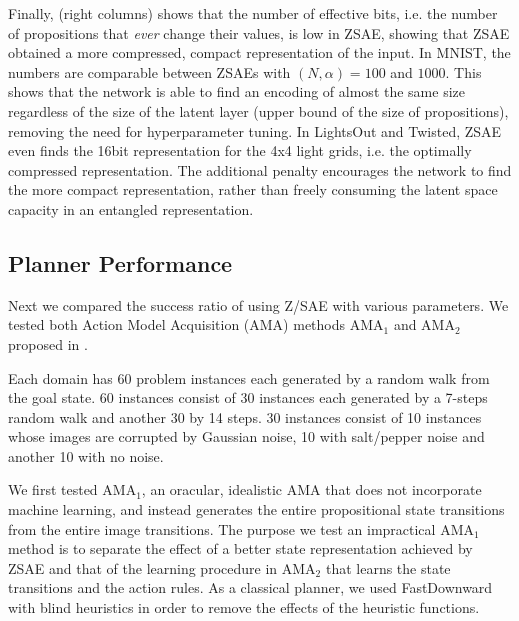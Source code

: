 Finally,  (right columns) shows that the number of effective bits,
i.e. the number of propositions that \emph{ever} change their values, is low in ZSAE, showing that
ZSAE obtained a more compressed, compact representation of the input.
In MNIST, the numbers are comparable between ZSAEs with $(N,\alpha)=100$ and $1000$.
This shows that the network is able to find an encoding of almost the same size
regardless of the size of the latent layer (upper bound of the size of
propositions), removing the need for hyperparameter tuning.
In LightsOut and Twisted, ZSAE even finds the 16bit representation for the 4x4 light grids,
i.e. the optimally compressed representation.
The additional
penalty encourages the network to find the more compact representation,
rather than freely consuming the latent space capacity in an entangled representation.


\subsection{Planner Performance}

Next we compared the success ratio of \latentplanner using Z/SAE with various parameters.
We tested both Action Model Acquisition (AMA) methods AMA$_1$ and AMA$_2$ proposed in \cite{Asai2018}.

Each domain has 60 problem instances each generated by a random walk from
the goal state. 60 instances consist of 30 instances each generated by a 7-steps random walk
and another 30 by 14 steps. 30 instances consist of 10 instances whose images are corrupted by Gaussian noise,
10 with salt/pepper noise and another 10 with no noise.

We first tested AMA$_1$, an oracular, idealistic AMA that does not incorporate machine learning,
and instead generates the entire propositional state transitions from the entire image transitions.
The purpose we test an impractical AMA$_1$ method is
to separate the effect of a better state representation achieved by ZSAE
and that of the learning procedure in AMA$_2$ that learns the state transitions and the action rules.
As a classical planner, we used FastDownward \cite{Helmert04} with blind heuristics in order to
remove the effects of the heuristic functions.

